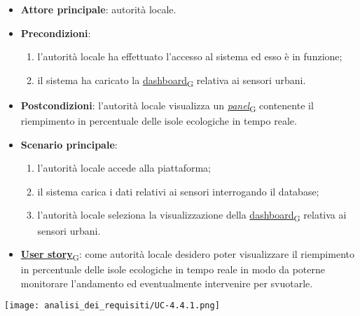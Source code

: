 \newpage
{}
\begin{itemize}
	\item \textbf{Attore principale}: autorità locale.
	\item \textbf{Precondizioni}:
	      \begin{enumerate}
		      \item l'autorità locale ha effettuato l'accesso al sistema ed esso è in funzione;
		      \item il sistema ha caricato la \href{https://7last.github.io/docs/pb/documentazione-interna/glossario\#dashboard}{dashboard\textsubscript{G}} relativa ai sensori urbani.
	      \end{enumerate}
	\item \textbf{Postcondizioni}: l'autorità locale visualizza un \href{https://7last.github.io/docs/pb/documentazione-interna/glossario\#panel}{\textit{panel}\textsubscript{G}} contenente il riempimento in percentuale delle isole ecologiche in tempo reale.
	\item \textbf{Scenario principale}:
	      \begin{enumerate}
		      \item l'autorità locale accede alla piattaforma;
		      \item il sistema carica i dati relativi ai sensori interrogando il database;
		      \item l'autorità locale seleziona la visualizzazione della \href{https://7last.github.io/docs/pb/documentazione-interna/glossario\#dashboard}{dashboard\textsubscript{G}} relativa ai sensori urbani.
	      \end{enumerate}
	\item \href{https://7last.github.io/docs/pb/documentazione-interna/glossario\#user-story}{\textbf{User story}\textsubscript{G}}:
	      come autorità locale desidero poter visualizzare il riempimento in percentuale delle isole ecologiche in tempo reale in modo da poterne monitorare l'andamento
	      ed eventualmente intervenire per svuotarle.
\end{itemize}
\begin{center}
	\texttt{[image: analisi\_dei\_requisiti/UC-4.4.1.png]}
\end{center}

